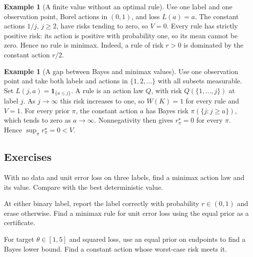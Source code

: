 \documentclass[11pt,oneside]{book}
\theoremstyle{definition}
\newtheorem{example}[theorem]{Example}
\theoremstyle{remark}
\begin{document}
\begin{example}[A finite value without an optimal rule]
\label{ex:minimax-nonattainment}
Use one label and one observation point, Borel actions in $(0,1)$,
and loss $L(a)=a$. The constant actions $1/j$, $j\geq2$, have risks
tending to zero, so $V=0$. Every rule has strictly positive risk:
its action is positive with probability one, so its mean cannot
be zero. Hence no rule is minimax. Indeed, a rule of risk $r>0$
is dominated by the constant action $r/2$.
\end{example}

\begin{example}[A gap between Bayes and minimax values]
\label{ex:infinite-minimax-gap}
Use one observation point and take both labels and actions in
$\{1,2,\ldots\}$ with all subsets measurable. Set
$L(j,a)=\mathbf 1_{\{a\leq j\}}$. A rule is an action law $Q$, with
risk $Q(\{1,\ldots,j\})$ at label $j$. As $j\to\infty$ this risk
increases to one, so $W(K)=1$ for every rule and $V=1$.
For every prior $\pi$, the constant action $a$ has Bayes risk
$\pi(\{j:j\geq a\})$, which tends to zero as $a\to\infty$.
Nonnegativity then gives $r_\pi^\star=0$ for every $\pi$. Hence
$\sup_\pi r_\pi^\star=0<V$.
\end{example}

\subsection{Exercises}
\label{subsec:worked-examples-2-4}

\begin{practiceexercise}
\label{wex:three-label-minimax}
With no data and unit error loss on three labels, find a minimax action law
and its value. Compare with the best deterministic value.
\end{practiceexercise}

\begin{practiceexercise}
\label{wex:erasure-minimax}
At either binary label, report the label correctly with probability
$r\in(0,1)$ and erase otherwise. Find a minimax rule for unit error loss
using the equal prior as a certificate.
\end{practiceexercise}

\begin{practiceexercise}
\label{wex:interval-no-data-minimax}
For target $\theta\in[1,5]$ and squared loss, use an equal prior on
endpoints to find a Bayes lower bound. Find a constant action whose
worst-case risk meets it.
\end{practiceexercise}
\end{document}
